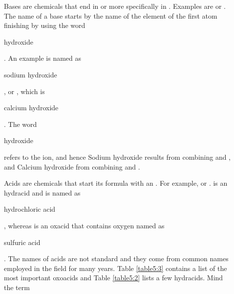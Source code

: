 \documentclass[main.tex]{subfiles}
\begin{document}
\begin{description}
\item[] Bases are chemicals that end in  or more specifically in . Examples are  or . The name of a base starts by the name of the element of the first atom finishing by using the word \begin{it}hydroxide\end{it}. An example is   named as \begin{it}sodium hydroxide\end{it}, or , which is \begin{it}calcium hydroxide\end{it}. The word  \begin{it}hydroxide\end{it} refers to the  ion, and hence Sodium hydroxide results from combining  and , and Calcium hydroxide from combining  and .

\item[] Acids are chemicals that start its formula with an . For example,  or .  is an hydracid and is named as  \begin{it}hydrochloric acid\end{it}, whereas   is an oxacid that contains oxygen named as \begin{it}sulfuric acid\end{it}.
The names of acids are not standard and they come from common names employed in the field for many years. Table \ref{table5:3} contains a list of the most important oxoacids and Table \ref{table5:2} lists a few hydracids. Mind the term 


\end{description}
\end{document}
